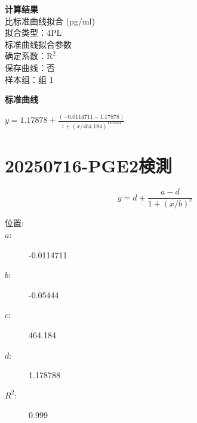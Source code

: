\documentclass[UTF8,10pt,a4paper,fontset=fandol]{ctexart}
\newcommand{\fieldvalue}[1]{#1}
\begin{document}
\medskip
\noindent\textbf{计算结果}\\
\hspace*{1em}比标准曲线拟合 (pg/ml)\\
\hspace*{1em}拟合类型：4PL\\
\hspace*{1em}标准曲线拟合参数\\
\hspace*{1em}确定系数：\(\mathrm{R}^2\)\\
\hspace*{1em}保存曲线：否\\
\hspace*{1em}样本组：组 1

\begin{center}
\textbf{标准曲线}

\vspace{0.5em}

\vspace{0.5em}
\(\displaystyle y=1.17878+\frac{(-0.0114711-1.17878)}
 {1+(x/464.184)^{1.05444}}\)
\end{center}

\newpage

\section{20250716-PGE2検測}

\[
y = d + \frac{a-d}{1+(x/b)^c}
\]

\begin{description}
  \item[位置:]
  \item[$a$:] 
  \fieldvalue{-0.0114711}
  \item[$b$:] 
  \fieldvalue{-0.05444}
  \item[$c$:] 
  \fieldvalue{464.184}
  \item[$d$:] 
  \fieldvalue{1.178788}
  \item[$R^2$:] 
  \fieldvalue{0.999}
\end{description}
\end{document}

